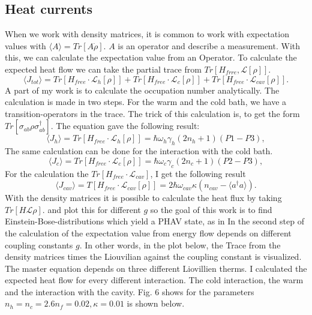\documentclass[12pt,a4paper]{article}
\begin{document}
\subsection{Heat currents}
 When we work with density matrices, it is common to work with expectation values with $\langle A \rangle=Tr[A\dot{\rho}]$.
 $A$ is an operator and describe a measurement.
With this, we can calculate the expectation value from an Operator. 
To calculate the expected heat flow we can take the partial trace from $Tr[H_{frre},\mathcal{L}[\rho]]$. 
\begin{equation}
\langle J_{tot}\rangle=Tr[H_{free}\cdot \mathcal{L}_h[\rho]]+Tr[H_{free}\cdot \mathcal{L}_c[\rho]]+Tr[H_{free}\cdot \mathcal{L}_{cav}[\rho]].\label{13}
\end{equation}
A part of my work is to calculate the occupation number analytically. 
The calculation is made in two steps. For the warm and the cold bath, we have a transition-operators in the trace.
The trick of this calculation is, to get the form $Tr[\sigma_{ab}\rho \sigma_{ab}^{\dag{}}]$.
The equation gave the following result:
\begin{equation}
\langle J_h \rangle=Tr[H_{free}\cdot \mathcal{L}_h[\rho]]=\hbar \omega_h \gamma_h (2n_h+1) ( P1-P3) ,
\end{equation}
The same calculation can be done for the interaction with the cold bath.
\begin{equation}
\langle J_c \rangle=Tr[H_{free}\cdot \mathcal{L}_c[\rho]]=\hbar \omega_c \gamma_c (2n_c+1) ( P2-P3) ,
\end{equation}
For the calculation the $Tr[H_{free}\cdot \mathcal{L}_{cav}]$, I get the following result
\begin{equation}
\langle J_{cav}\rangle=T[H_{free}\cdot \mathcal{L}_{cav}[\rho]]=2\hbar \omega_{cav}\kappa (n_{cav}-\langle a^{\dag{}}a \rangle).
\end{equation}
With the density matrices it is possible to calculate the heat flux by taking $Tr[H \mathcal{L}\rho]$. 
and plot this for different  $g$ 
so the goal of this work is to find Einstein-Bose-distributions which yield a PHAV state,
as in \cite{Allevi2013}   %
In the second step of the calculation of the  expectation value from energy flow depends on different coupling constants $g$.
In other words, in the plot below, the Trace from the density matrices times the Liouvilian against the coupling constant is visualized.
The master equation depends on three different Liovillien therms. I calculated the expected heat flow for every different interaction. The cold interaction, the warm and the interaction with the cavity.
Fig. 6 shows  for the parameters $n_h=n_c=2.6 n_f=0.02,\kappa=0.01 $ is shown below.
\end{document}
